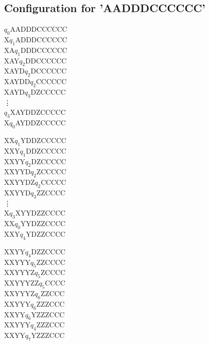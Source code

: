 \documentclass{article}
\begin{document}
	\subsection{Configuration for 'AADDDCCCCCC'}
	\begin{multicols}{3}
		\begin{minipage}{0.33\textwidth}
			$q_0$AADDDCCCCCC\\
			X$q_1$ADDDCCCCCC\\
			XA$q_1$DDDCCCCCC\\
			XAY$q_2$DDCCCCCC\\
			XAYD$q_2$DCCCCCC\\
			XAYDD$q_2$CCCCCC\\
			XAYD$q_3$DZCCCCC\\
			\vdots \\
			$q_3$XAYDDZCCCCC\\
			X$q_0$AYDDZCCCCC\\

		\end{minipage}
		
		\begin{minipage}{0.33\textwidth}
			XX$q_1$YDDZCCCCC\\
			XXY$q_1$DDZCCCCC\\
			XXYY$q_2$DZCCCCC\\
			XXYYD$q_2$ZCCCCC\\
			XXYYDZ$q_2$CCCCC\\
			XXYYD$q_3$ZZCCCC\\
			\vdots \\
			X$q_3$XYYDZZCCCC\\
			XX$q_0$YYDZZCCCC\\
			XXY$q_4$YDZZCCCC\\

			
		\end{minipage}
		
		\begin{minipage}{0.33\textwidth}
			XXYY$q_4$DZZCCCC\\
			XXYYY$q_5$ZZCCCC\\
			XXYYYZ$q_5$ZCCCC\\
			XXYYYZZ$q_5$CCCC\\
			XXYYYZ$q_6$ZZCCC\\
			XXYYY$q_6$ZZZCCC\\
			XXYY$q_6$YZZZCCC\\
			XXYYY$q_4$ZZZCCC\\
			XXYY$q_7$YZZZCCC\\
		\end{minipage}
	\end{multicols}
	\newpage
\end{document}
